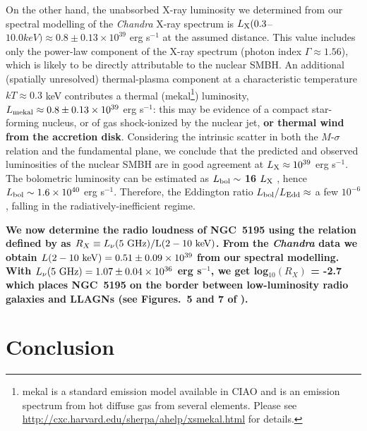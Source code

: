 \documentclass[fleqn,usenatbib]{mnras}
\def\figs{Figures.}
\begin{document}
On the other hand, the unabsorbed X-ray luminosity we determined from our spectral modelling of the 
{\it Chandra} X-ray spectrum is $L_{\rm X} (0.3$--$10.0 keV) \approx 0.8 \pm 0.13 \times 10^{39}$ erg s$^{-1}$ at the assumed 
distance. This value includes only the power-law component of the X-ray spectrum (photon index $\Gamma 
\approx 1.56$), which is likely to be directly attributable to the nuclear SMBH. An additional 
(spatially unresolved) thermal-plasma component at a characteristic temperature $kT \approx 0.3$ keV 
contributes a thermal (mekal\footnote{mekal is a standard emission model available in CIAO and is an emission spectrum from hot diffuse gas from several elements.  Please see \url{http://cxc.harvard.edu/sherpa/ahelp/xsmekal.html} for details.}) luminosity, $L_{\rm{mekal}} \approx 0.8 \pm 0.13 \times 10^{39}$ erg s$^{-1}$: this may be evidence 
of a compact star-forming nucleus, or of gas shock-ionized by the nuclear jet, \textbf{or thermal wind from the accretion disk}. Considering the 
intrinsic scatter in both the $M$-$\sigma$ relation and the fundamental plane, we conclude that the 
predicted and observed luminosities of the nuclear SMBH are in good agreement at $L_{\rm X} \approx 
10^{39}$ erg s$^{-1}$. The bolometric luminosity can be estimated as  $L_{\rm {bol}} \sim$ \textbf{16} $L_{\rm X}$ 
\citep{Ho2008}, hence $L_{\rm {bol}} \sim 1.6 \times 10^{40}$ 
erg s$^{-1}$. Therefore, the Eddington ratio $L_{\rm{bol}}/L_{\rm{Edd}} \approx$ a few $10^{-6}$, 
falling in the radiatively-inefficient regime.

\textbf{We now determine the radio loudness of NGC~5195 using the relation defined by \cite{TW2003} as $R_{X} \equiv L_{\nu}(5 ~\rm GHz)/L(2-10~ \rm keV)$. From the \textit{Chandra} data we obtain $L(2-10~ \rm keV) = 0.51 \pm 0.09 \times 10^{39}$ from our spectral modelling. With $L_{\nu}(5 ~\rm GHz) = 1.07 \pm 0.04 \times 10^{36}$ erg s$^{-1}$, we get log$_{10}(R_{X})$ = -2.7 which places NGC~5195 on the border between low-luminosity radio galaxies and LLAGNs (see \figs~5 and 7 of \citealt{Panessaetal2007}). 
}

\section{Conclusion}
\end{document}
